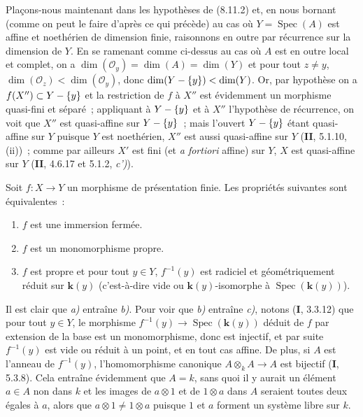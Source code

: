 Plaçons-nous maintenant dans les hypothèses de (8.11.2) et, en nous bornant
(comme on peut le faire d'après ce qui précède) au cas où
$Y=\operatorname{Spec}(A)$ est affine et noethérien de dimension finie,
raisonnons en outre par récurrence sur la dimension de $Y$. En se ramenant
comme ci-dessus au cas où $A$ est en outre local et complet, on a
$\dim(\mathcal O_y)=\dim(A)=\dim(Y)$ et pour tout $z\neq y$,
$\dim(\mathcal O_z)<\dim(\mathcal O_y)$, donc
$\dim(Y-\{y\})<\dim(Y)$. Or, par hypothèse on a
$f(X'')\subset Y-\{y\}$ et la restriction de $f$ à $X''$ est évidemment un
morphisme quasi-fini et séparé~; appliquant à $Y-\{y\}$ et à $X''$
l'hypothèse de récurrence, on voit que $X''$ est quasi-affine sur
$Y-\{y\}$~; mais l'ouvert $Y-\{y\}$ étant quasi-affine sur $Y$ puisque $Y$ est
noethérien, $X''$ est aussi quasi-affine sur $Y$ (\textbf{II}, 5.1.10, (ii))~; comme
par ailleurs $X'$ est fini (et \emph{a fortiori} affine) sur $Y$, $X$ est
quasi-affine sur $Y$ (\textbf{II}, 4.6.17 et 5.1.2, \emph{c')}).

\begin{proposition}[8.11.5]
\label{IV.8.11.5-fr}
Soit $f:X\to Y$ un morphisme de présentation finie. Les propriétés suivantes
sont équivalentes~:
\begin{enumerate}
\item[\emph{a)}] $f$ est une immersion fermée.
\item[\emph{b)}] $f$ est un monomorphisme propre.
\item[\emph{c)}] $f$ est propre et pour tout $y\in Y$, $f^{-1}(y)$ est
radiciel et géométriquement réduit sur $\boldsymbol{k}(y)$ (c'est-à-dire vide ou
$\boldsymbol{k}(y)$-isomorphe à $\operatorname{Spec}(\boldsymbol{k}(y))$).
\end{enumerate}
\end{proposition}

Il est clair que \emph{a)} entraîne \emph{b)}. Pour voir que \emph{b)}
entraîne \emph{c)}, notons (\textbf{I}, 3.3.12) que pour tout $y\in Y$, le morphisme
$f^{-1}(y)\to\operatorname{Spec}(\boldsymbol{k}(y))$ déduit de $f$ par extension de la base
est un monomorphisme, donc est injectif, et par suite $f^{-1}(y)$ est vide ou
réduit à un point, et en tout cas affine. De plus, si $A$ est l'anneau de
$f^{-1}(y)$, l'homomorphisme canonique $A\otimes_kA\to A$ est bijectif
(\textbf{I}, 5.3.8). Cela entraîne évidemment que $A=k$, sans quoi il y aurait un
élément $a\in A$ non dans $k$ et les images de $a\otimes1$ et de $1\otimes a$
dans $A$ seraient toutes deux égales à $a$, alors que $a\otimes1\neq1\otimes a$
puisque $1$ et $a$ forment un système libre sur $k$.

